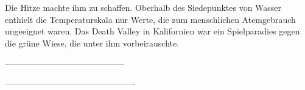 Die Hitze machte ihm zu schaffen. Oberhalb des Siedepunktes von Wasser enthielt die Temperaturskala nur Werte, die zum menschlichen Atemgebrauch ungeeignet waren. Das Death Valley in Kalifornien war ein Spielparadies gegen die grüne Wiese, die unter ihm vorbeirauschte.























































------------------------------------------



















































----------------------------------------------

























